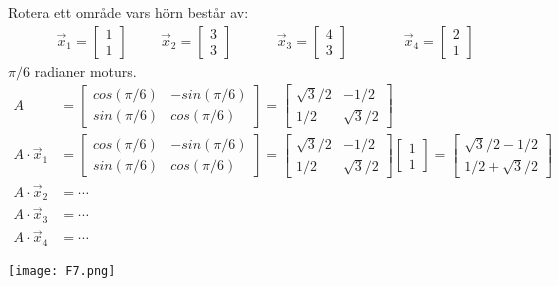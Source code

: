 \begin{Ex}
    Rotera ett område vars hörn består av:
    \begin{align*}
    &\vec{x}_1 = \begin{bmatrix} 1\\1 \end{bmatrix}
    &&&\vec{x}_2 = \begin{bmatrix} 3\\3 \end{bmatrix}
    &&&&\vec{x}_3 = \begin{bmatrix} 4\\3 \end{bmatrix}
    &&&&&\vec{x}_4 = \begin{bmatrix} 2\\1 \end{bmatrix}
    \end{align*}
    $\pi/6$ radianer moturs.
    \begin{align*}
    	A &= \begin{bmatrix} cos(\pi/6)&-sin(\pi/6)\\sin(\pi/6)&cos(\pi/6)\end{bmatrix} = \begin{bmatrix} \sqrt{3}/2&-1/2\\1/2&\sqrt{3}/2 \end{bmatrix}\\
    	A \cdot \vec{x}_1 &= \begin{bmatrix} cos(\pi/6)&-sin(\pi/6)\\sin(\pi/6)&cos(\pi/6)\end{bmatrix} = \begin{bmatrix} \sqrt{3}/2&-1/2\\1/2&\sqrt{3}/2 \end{bmatrix} \begin{bmatrix} 1\\1 \end{bmatrix} = \begin{bmatrix} \sqrt{3}/2-1/2\\1/2+\sqrt{3}/2 \end{bmatrix}\\
    	A \cdot \vec{x}_2 &= \cdots \\
    	A \cdot \vec{x}_3 &= \cdots\\
    	A \cdot \vec{x}_4 &= \cdots
    \end{align*}
    \begin{center}
    	\texttt{[image: F7.png]}
    \end{center}
\end{Ex}
